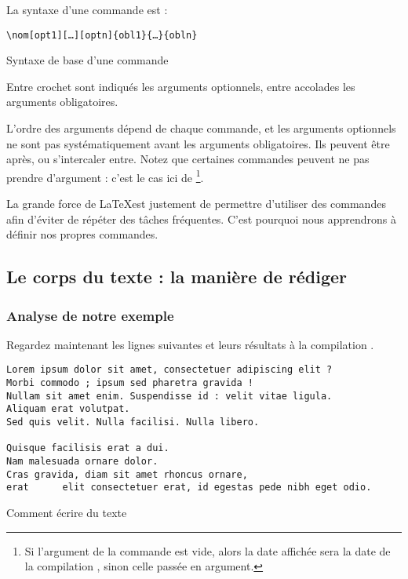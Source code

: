 La syntaxe d'une commande est :


\begin{listing}[ht]

\begin{verbatim}
\nom[opt1][…][optn]{obl1}{…}{obln}
\end{verbatim}
\caption{Syntaxe de base d'une commande}
\end{listing}

Entre crochet sont indiqués les arguments optionnels, entre accolades les arguments obligatoires.


L'ordre des arguments dépend de chaque commande, et les arguments optionnels ne sont pas systématiquement avant les arguments obligatoires. Ils peuvent être après, ou s'intercaler entre. Notez que certaines commandes peuvent ne pas prendre d'argument : c'est le cas ici de \footnote{Si l'argument de la commande   est vide, alors la date affichée  sera la date de la compilation , sinon celle passée en argument.}.

La grande force de \LaTeX est justement de permettre d'utiliser des commandes afin d'éviter de répéter des tâches fréquentes. C'est pourquoi nous apprendrons à définir nos propres commandes.



\subsection{Le corps du texte : la manière de rédiger}

\subsubsection{Analyse de notre exemple}
Regardez maintenant les lignes suivantes et leurs résultats à la compilation .

\begin{listing}[ht]
\begin{verbatim}
Lorem ipsum dolor sit amet, consectetuer adipiscing elit ?
Morbi commodo ; ipsum sed pharetra gravida !
Nullam sit amet enim. Suspendisse id : velit vitae ligula.
Aliquam erat volutpat.
Sed quis velit. Nulla facilisi. Nulla libero. 

Quisque facilisis erat a dui.
Nam malesuada ornare dolor.
Cras gravida, diam sit amet rhoncus ornare, 
erat      elit consectetuer erat, id egestas pede nibh eget odio.
\end{verbatim}
\caption{Comment écrire du texte}
\end{listing}


